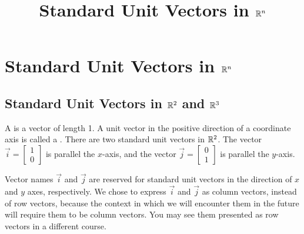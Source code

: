\documentclass{ximera}
\title{Standard Unit Vectors in $\mathbb{R}^n$} \license{CC BY-NC-SA 4.0}
\begin{document}
\begin{abstract}
  
\end{abstract}
\maketitle

\section*{Standard Unit Vectors in $\mathbb{R}^n$}

\subsection*{Standard Unit Vectors in $\mathbb{R}^2$ and $\mathbb{R}^3$} 
A  is a vector of length 1.  A unit vector in the positive direction of a coordinate axis is called a .  There are two standard unit vectors in $\mathbb{R}^2$.  The vector $\vec{i}=\begin{bmatrix}
1\\
0
\end{bmatrix}$ is parallel the $x$-axis, and the vector $\vec{j}=\begin{bmatrix}
0\\
1
\end{bmatrix}$ is parallel the $y$-axis.  

\begin{center}
\end{center}

Vector names $\vec{i}$ and $\vec{j}$ are reserved for standard unit vectors in the direction of $x$ and $y$ axes, respectively.  We chose to express $\vec{i}$ and $\vec{j}$ as column vectors, instead of row vectors, because the context in which we will encounter them in the future will require them to be column vectors.  You may see them presented as row vectors in a different course.
\end{document}
